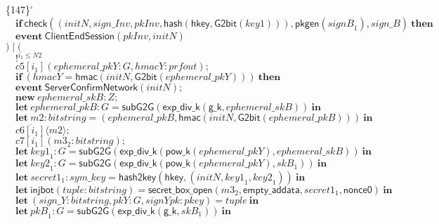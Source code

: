 \documentclass{article}
\newcommand{\cinput}[2]{{#1}({#2})}
\newcommand{\coutput}[2]{\overline{#1}\langle{#2}\rangle}
\newcommand{\kw}[1]{\mathbf{#1}}
\newcommand{\kwf}[1]{\mathsf{#1}}
\newcommand{\var}[1]{\mathit{#1}}
\newcommand{\kwt}[1]{\mathit{#1}}
\newcommand{\kwp}[1]{\mathit{#1}}
\newcommand{\kwc}[1]{\mathit{#1}}
\begin{document}
\begin{tabbing}
\>\{147\}\'$\quad \kw{if}\ \kwf{check}(\kwf{}(\var{initN}, \var{sign{\_}Inv}, \var{pkInv}, \kwf{hash}(\kwf{hkey}, \kwf{G2bit}(\var{key1}))), \kwf{pkgen}(\var{signB}_{1}), \var{sign{\_}B})\ \kw{then}$\\
\>$\quad \kw{event}\ \kwf{ClientEndSession}(\var{pkInv}, \var{initN})$\\
\>$) \mid ($\\
\>$\quad !^{\var{i}_{1} \leq \kwp{N2}}$\\
\>$\quad \cinput{\kwc{c5}[\var{i}_{1}]}{\var{ephemeral{\_}pkY}: \kwt{G}, \var{hmacY}: \kwt{prfout}};$\\
\>$\quad \kw{if}\ (\var{hmacY}  =  \kwf{hmac}(\var{initN}, \kwf{G2bit}(\var{ephemeral{\_}pkY})))\ \kw{then}$\\
\>$\quad \kw{event}\ \kwf{ServerConfirmNetwork}(\var{initN});$\\
\>$\quad \kw{new}\ \var{ephemeral{\_}skB}: \kwt{Z};$\\
\>$\quad \kw{let}\ \var{ephemeral{\_}pkB}: \kwt{G} = \kwf{subG2G}(\kwf{exp{\_}div{\_}k}(\kwf{g{\_}k}, \var{ephemeral{\_}skB}))\ \kw{in}$\\
\>$\quad \kw{let}\ \var{m2}: \kwt{bitstring} = \kwf{}(\var{ephemeral{\_}pkB}, \kwf{hmac}(\var{initN}, \kwf{G2bit}(\var{ephemeral{\_}pkB})))\ \kw{in}$\\
\>$\quad \coutput{\kwc{c6}[\var{i}_{1}]}{\var{m2}};$\\
\>$\quad \cinput{\kwc{c7}[\var{i}_{1}]}{\var{m3}_{2}: \kwt{bitstring}};$\\
\>$\quad \kw{let}\ \var{key1}_{1}: \kwt{G} = \kwf{subG2G}(\kwf{exp{\_}div{\_}k}(\kwf{pow{\_}k}(\var{ephemeral{\_}pkY}), \var{ephemeral{\_}skB}))\ \kw{in}$\\
\>$\quad \kw{let}\ \var{key2}_{1}: \kwt{G} = \kwf{subG2G}(\kwf{exp{\_}div{\_}k}(\kwf{pow{\_}k}(\var{ephemeral{\_}pkY}), \var{skB}_{1}))\ \kw{in}$\\
\>$\quad \kw{let}\ \var{secret1}_{1}: \kwt{sym{\_}key} = \kwf{hash2key}(\kwf{hkey}, \kwf{}(\var{initN}, \var{key1}_{1}, \var{key2}_{1}))\ \kw{in}$\\
\>$\quad \kw{let}\ \kwf{injbot}(\var{tuple}: \kwt{bitstring}) = \kwf{secret{\_}box{\_}open}(\var{m3}_{2}, \kwf{empty{\_}addata}, \var{secret1}_{1}, \kwf{nonce0})\ \kw{in}$\\
\>$\quad \kw{let}\ \kwf{}(\var{sign{\_}Y}: \kwt{bitstring}, \var{pkY}: \kwt{G}, \var{signYpk}: \kwt{pkey}) = \var{tuple}\ \kw{in}$\\
\>$\quad \kw{let}\ \var{pkB}_{1}: \kwt{G} = \kwf{subG2G}(\kwf{exp{\_}div{\_}k}(\kwf{g{\_}k}, \var{skB}_{1}))\ \kw{in}$\\

\end{tabbing}
\end{document}
